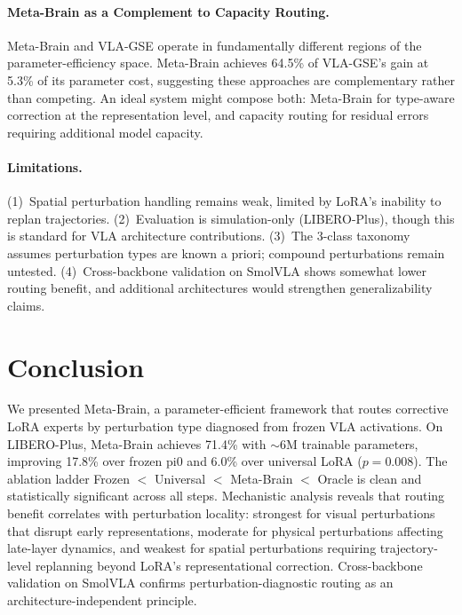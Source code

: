 \documentclass[letterpaper]{article}
\begin{document}
\paragraph{Meta-Brain as a Complement to Capacity Routing.}
Meta-Brain and VLA-GSE operate in fundamentally different regions of the parameter-efficiency space.
Meta-Brain achieves 64.5\% of VLA-GSE's gain at 5.3\% of its parameter cost, suggesting these approaches are complementary rather than competing.
An ideal system might compose both: Meta-Brain for type-aware correction at the representation level, and capacity routing for residual errors requiring additional model capacity.

\paragraph{Limitations.}
(1)~Spatial perturbation handling remains weak, limited by LoRA's inability to replan trajectories.
(2)~Evaluation is simulation-only (LIBERO-Plus), though this is standard for VLA architecture contributions.
(3)~The 3-class taxonomy assumes perturbation types are known a priori; compound perturbations remain untested.
(4)~Cross-backbone validation on SmolVLA shows somewhat lower routing benefit, and additional architectures would strengthen generalizability claims.

\section{Conclusion}

We presented Meta-Brain, a parameter-efficient framework that routes corrective LoRA experts by perturbation type diagnosed from frozen VLA activations.
On LIBERO-Plus, Meta-Brain achieves 71.4\% with ${\sim}6$M trainable parameters, improving 17.8\% over frozen pi0 and 6.0\% over universal LoRA ($p = 0.008$).
The ablation ladder Frozen $<$ Universal $<$ Meta-Brain $<$ Oracle is clean and statistically significant across all steps.
Mechanistic analysis reveals that routing benefit correlates with perturbation locality: strongest for visual perturbations that disrupt early representations, moderate for physical perturbations affecting late-layer dynamics, and weakest for spatial perturbations requiring trajectory-level replanning beyond LoRA's representational correction.
Cross-backbone validation on SmolVLA confirms perturbation-diagnostic routing as an architecture-independent principle.
\end{document}
